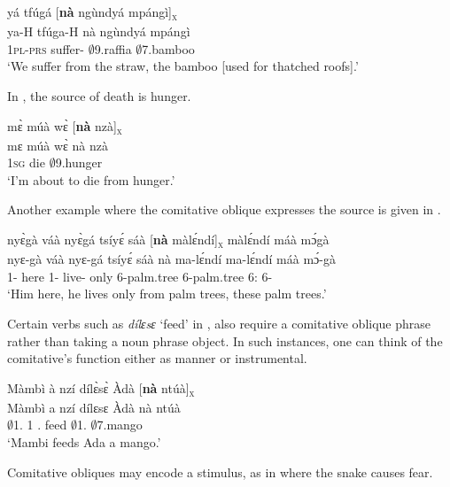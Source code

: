 \ea \label{naSOU1}
  \glll     yá tfúgá [{\bfseries nà} ngùndyá mpángì]\textsubscript{\textsc{x}} \\
            ya-H tfúga-H {\db}nà ngùndyá mpángì \\
              1\textsc{pl}-\textsc{prs} suffer-{\R} {\db}{\COM} $\emptyset$9.raffia $\emptyset$7.bamboo\\
    \trans `We suffer from the straw, the bamboo [used for thatched roofs].'
\z

\noindent In , the source of death is hunger.

\ea \label{naSOU2}
  \glll  mɛ̀ múà wɛ̀ [{\bfseries nà} nzà]\textsubscript{\textsc{x}} \\
        mɛ múà wɛ̀ {\db}nà nzà \\
          1\textsc{sg} {\PROSP} die {\db}{\COM} $\emptyset$9.hunger\\
    \trans `I'm about to die from hunger.'
\z

\noindent Another example where the comitative oblique expresses the source is given in .

\ea \label{SOU3}
  \glll nyɛ̀gà váà nyɛ̀gá tsíyɛ́ sáà [{\bfseries nà} màlɛ́ndí]\textsubscript{\textsc{x}} màlɛ́ndí máà mɔ́gà \\
         nyɛ-gà váà nyɛ-gá tsíyɛ́ sáà {\db}nà ma-lɛ́ndí ma-lɛ́ndí máà mɔ́-gà \\
          1-{\CONTR} here 1-{\CONTR} live-{\R} only {\db}{\COM} 6-palm.tree 6-palm.tree 6:{\DEM} 6-{\CONTR} \\
    \trans `Him here, he lives only from palm trees, these palm trees.'
\z

Certain verbs such as {\itshape dílɛsɛ} `feed' in , also require a comitative oblique phrase rather than taking a noun phrase object. In such instances, one can think of the comitative's function either as manner or instrumental.

\ea \label{SOU4}
  \glll Màmbì à nzí dílɛ̀sɛ̀ Àdà [{\bfseries nà} ntúà]\textsubscript{\textsc{x}}  \\
        Màmbì a nzí dílɛsɛ Àdà {\db}nà ntúà   \\
        $\emptyset$1.{\PN} 1 {\PROG}.{\PST} feed $\emptyset$1.{\PN} {\db}{\COM} $\emptyset$7.mango\\
    \trans `Mambi feeds Ada a mango.'
\z

\noindent Comitative obliques may encode a stimulus, as in  where the snake causes fear.

